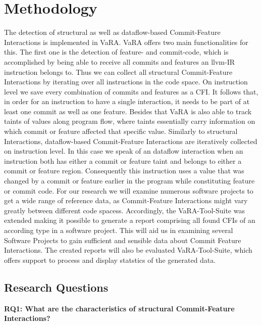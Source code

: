 \section*{Methodology}\label{ch:methodology}

The detection of structural as well as dataflow-based Commit-Feature Interactions is implemented in VaRA.
VaRA offers two main functionalities for this. 
The first one is the detection of feature- and commit-code, which is accomplished by being able to receive all commits and features an llvm-IR instruction belongs to.
Thus we can collect all structural Commit-Feature Interactions by iterating over all instructions in the code space.
On instruction level we save every combination of commits and features as a CFI.
It follows that, in order for an instruction to have a single interaction, it needs to be part of at least one commit as well as one feature.
Besides that VaRA is also able to track taints of values along program flow, where taints essentially carry information on which commit or feature affected that specific value.
Similarly to structural Interactions, dataflow-based Commit-Feature Interactions are iteratively collected on instruction level.
In this case we speak of an dataflow interaction when an instruction both has either a commit or feature taint and belongs to either a commit or feature region.
Consequently this instruction uses a value that was changed by a commit or feature earlier in the program while constituting feature or commit code.
For our research we will examine numerous software projects to get a wide range of reference data, as Commit-Feature Interactions might vary greatly between different code spacess.
Accordingly, the VaRA-Tool-Suite was extended making it possible to generate a report comprising all found CFIs of an according type in a software project.
This will aid us in examining several Software Projects to gain sufficient and sensible data about Commit Feature Interactions.
The created reports will also be evaluated VaRA-Tool-Suite, which offers support to process and display statstics of the generated data.

\subsection*{Research Questions}\label{sec:research_questions}

\textbf{RQ1: What are the characteristics of structural Commit-Feature Interactions?}

